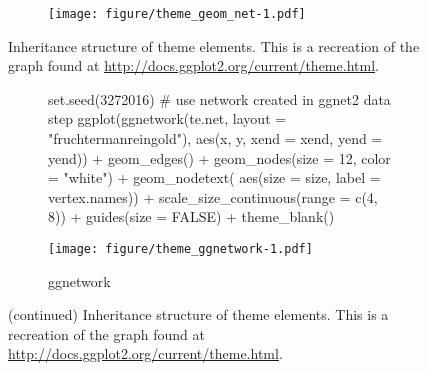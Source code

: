 \begin{figure}[hbtp]
\begin{subfigure}[t]{\textwidth}
\begin{adjustbox}{valign=t}
\begin{minipage}{.49\textwidth}
                   \end{minipage}

                  \begin{minipage}{.49\textwidth}

\texttt{[image: figure/theme\_geom\_net-1.pdf]}

                          \end{minipage}

                          \end{adjustbox}
\end{subfigure}

\caption{\label{fig.cap:theme} Inheritance structure of  theme elements. This is a recreation of the graph found at \protect\url{http://docs.ggplot2.org/current/theme.html}.}
\end{figure}

\begin{figure}
\ContinuedFloat
\begin{subfigure}[t]{\textwidth}
\caption{ggnetwork}


             \begin{adjustbox}{valign=t}

             \begin{minipage}{.49\textwidth}
{\footnotesize 
\begin{example}
set.seed(3272016)
# use network created in ggnet2 data step
ggplot(ggnetwork(te.net, 
                 layout = "fruchtermanreingold"),
       aes(x, y, xend = xend, yend = yend)) +
  geom_edges() +
  geom_nodes(size = 12, color = "white") +
  geom_nodetext(
    aes(size = size, label = vertex.names)) +
  scale_size_continuous(range = c(4, 8)) +
  guides(size = FALSE) +
  theme_blank()
\end{example} 
}

                   \end{minipage}

                  \begin{minipage}{.49\textwidth}

\texttt{[image: figure/theme\_ggnetwork-1.pdf]}

                          \end{minipage}

                          \end{adjustbox}
\end{subfigure}
\caption{\label{fig.cap:theme:c}(continued) Inheritance structure of  theme elements. This is a recreation of the graph found at \protect\url{http://docs.ggplot2.org/current/theme.html}.}
\end{figure}

